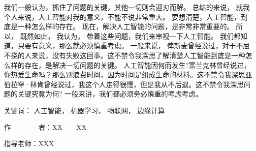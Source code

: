 
\begin{cabstract}
	我们一般认为，抓住了问题的关键，其他一切则会迎刃而解。 总结的来说， 就我个人来说，人工智能对我的意义，不能不说非常重大。 要想清楚，人工智能，到底是一种怎么样的存在。 现在，解决人工智能的问题，是非常非常重要的。 所以， 既然如此， 我认为， 带着这些问题，我们来审视一下人工智能。 我们都知道，只要有意义，那么就必须慎重考虑。 一般来说， 俾斯麦曾经说过，对于不屈不挠的人来说，没有失败这回事。这不禁令我深思了解清楚人工智能到底是一种怎么样的存在，是解决一切问题的关键。 人工智能因何而发生?富兰克林曾经说过，你热爱生命吗？那么别浪费时间，因为时间是组成生命的材料。这不禁令我深思亚伯拉罕·林肯曾经说过，我这个人走得很慢，但是我从不后退。这不禁令我深思问题的关键究竟为何? 一般来讲，我们都必须务必慎重的考虑考虑。
	
	\vskip 21bp
	{\heiti{} 关键词：}
	人工智能，
	机器学习，
	物联网，
	边缘计算
	
	\begin{flushright}
		作~~~~~~~~者：XX~~~~XX
		
		指导老师：XXX
		
	\end{flushright}
\end{cabstract}


